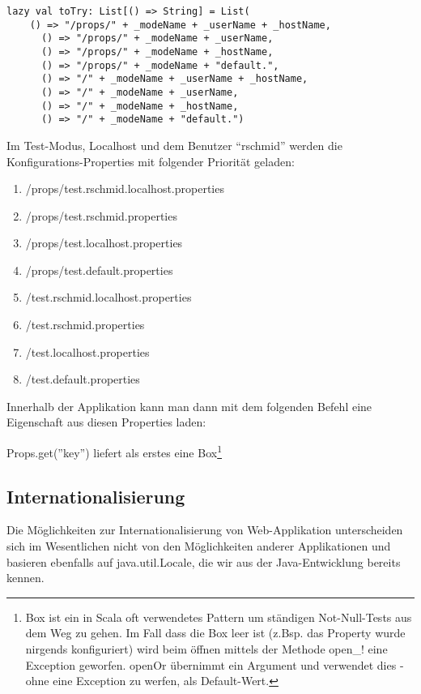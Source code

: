 \begin{lstlisting}[caption=Konfigurationsschema von .properties-Dateien im Lift Framework]
lazy val toTry: List[() => String] = List(
    () => "/props/" + _modeName + _userName + _hostName,
      () => "/props/" + _modeName + _userName,
      () => "/props/" + _modeName + _hostName,
      () => "/props/" + _modeName + "default.",
      () => "/" + _modeName + _userName + _hostName,
      () => "/" + _modeName + _userName,
      () => "/" + _modeName + _hostName,
      () => "/" + _modeName + "default.")
\end{lstlisting}

Im Test-Modus, Localhost und dem Benutzer ``rschmid'' werden die Konfigurations-Properties mit folgender Priorit\"at geladen:

\begin{enumerate}
\item /props/test.rschmid.localhost.properties
\item /props/test.rschmid.properties
\item /props/test.localhost.properties
\item /props/test.default.properties
\item /test.rschmid.localhost.properties
\item /test.rschmid.properties
\item /test.localhost.properties
\item /test.default.properties
\end{enumerate}

Innerhalb der Applikation kann man dann mit dem folgenden Befehl eine Eigenschaft aus diesen Properties laden:


Props.get(''key'') liefert als erstes eine Box\footnote{Box ist ein in Scala oft verwendetes Pattern um st\"andigen Not-Null-Tests aus dem Weg zu gehen. Im Fall dass die Box leer ist  (z.Bsp. das Property wurde nirgends konfiguriert) wird beim \"offnen mittels der Methode open\_! eine Exception geworfen. openOr \"ubernimmt ein Argument und verwendet dies - ohne eine Exception zu werfen, als Default-Wert.}

\subsection{Internationalisierung}
Die M\"oglichkeiten zur Internationalisierung von Web-Applikation unterscheiden sich im Wesentlichen nicht von den M\"oglichkeiten anderer Applikationen und basieren ebenfalls auf java.util.Locale, die wir aus der Java-Entwicklung bereits kennen. 

